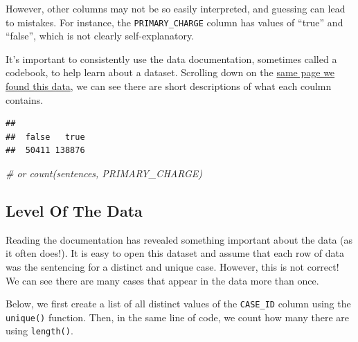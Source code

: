 \documentclass[]{article}
\newenvironment{Shaded}{\begin{snugshade}}{\end{snugshade}}
\newcommand{\KeywordTok}[1]{\textcolor[rgb]{0.13,0.29,0.53}{\textbf{#1}}}
\newcommand{\CommentTok}[1]{\textcolor[rgb]{0.56,0.35,0.01}{\textit{#1}}}
\newcommand{\OperatorTok}[1]{\textcolor[rgb]{0.81,0.36,0.00}{\textbf{#1}}}
\newcommand{\NormalTok}[1]{#1}
\begin{document}
However, other columns may not be so easily interpreted, and guessing
can lead to mistakes. For instance, the \texttt{PRIMARY\_CHARGE} column
has values of ``true'' and ``false'', which is not clearly
self-explanatory.

It's important to consistently use the data documentation, sometimes
called a codebook, to help learn about a dataset. Scrolling down on the
\href{https://datacatalog.cookcountyil.gov/Courts/Sentencing/tg8v-tm6u}{same
page we found this data}, we can see there are short descriptions of
what each coulmn contains.

\begin{Shaded}
\end{Shaded}

\begin{verbatim}
## 
##  false   true 
##  50411 138876
\end{verbatim}

\begin{Shaded}
\begin{Highlighting}[]
\CommentTok{# or count(sentences, PRIMARY_CHARGE)}
\end{Highlighting}
\end{Shaded}

\subsection{Level Of The Data}\label{level-of-the-data}

Reading the documentation has revealed something important about the
data (as it often does!). It is easy to open this dataset and assume
that each row of data was the sentencing for a distinct and unique case.
However, this is not correct! We can see there are many cases that
appear in the data more than once.

Below, we first create a list of all distinct values of the
\texttt{CASE\_ID} column using the \texttt{unique()} function. Then, in
the same line of code, we count how many there are using
\texttt{length()}.

\begin{Shaded}
\end{Shaded}
\end{document}
